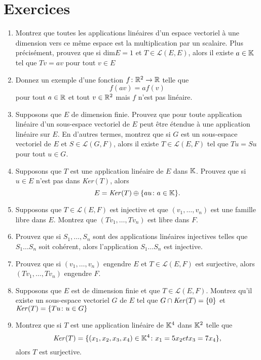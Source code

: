 \documentclass[12pt]{book}
\begin{document}
\section*{Exercices}
\begin{enumerate}
    \item Montrez que toutes les applications linéaires d'un espace vectoriel à une dimension vers ce même espace est la multiplication par un scalaire. Plus précisément, prouvez que si dim$E=1$ et $T\in\mathcal{L}(E,E)$, alors il existe $a\in\mathbb{K}$ tel que $Tv=av$ pour tout $v\in E$
    \item Donnez un exemple d'une fonction $f\colon\mathbb{R}^2\rightarrow\mathbb{R}$ telle que 
    \begin{equation*}
        f(av)=af(v)
    \end{equation*}
    pour tout $a\in\mathbb{R}$ et tout $v\in\mathbb{R}^2$ mais $f$ n'est pas linéaire.
    \item Supposons que $E$ de dimension finie. Prouvez que pour toute application linéaire d'un sous-espace vectoriel de $E$ peut être étendue à une application linéaire sur $E$. En d'autres termes, montrez que si $G$ est un sous-espace vectoriel de $E$ et $S\in\mathcal{L}(G,F)$, alors il existe $T\in\mathcal{L}(E,F)$ tel que $Tu=Su$ pour tout $u\in G$.
    \item Supposons que $T$ est une application linéaire de $E$ dans $\mathbb{K}$. Prouvez que si $u\in E$ n'est pas dans \textit{Ker}$(T)$, alors
    \begin{equation*}
       E=\textrm{\textit{Ker}}(T)\oplus\{au\colon a\in \mathbb{K}\}.
    \end{equation*}
    \item Supposons que $T\in\mathcal{L}(E,F)$ est injective et que $(v_1,\ldots,v_n)$ est une famille libre dans $E$. Montrez que $(Tv_1,\ldots,Tv_n)$ est libre dans $F$.
    \item Prouvez que si $S_1,\ldots,S_n$ sont des applications linéaires injectives telles que $S_1\ldots S_n$ soit cohérent, alors l'application $S_1\ldots S_n$ est injective.
    \item Prouvez que si $(v_1,\ldots,v_n)$ engendre $E$ et $T\in\mathcal{L}(E,F)$ est surjective, alors $(Tv_1,\ldots,Tv_n)$ engendre $F$.
    \item Supposons que $E$ est de dimension finie et que $T\in\mathcal{L}(E,F)$. Montrez qu'il existe un sous-espace vectoriel $G$ de $E$ tel que $G\cap\textrm{\textit{Ker}}(T)=\{0\}$ et $\textrm{\textit{Ker}}(T)=\{Tu\colon u\in G\}$
    \item Montrez que si $T$ est une application linéaire de $\mathbb{K}^4$ dans $\mathbb{K}^2$ telle que 
    \begin{equation*}
        \textrm{\textit{Ker}}(T)=\{(x_1,x_2,x_3,x_4)\in\mathbb{K}^4\colon x_1=5x_2 et x_3=7x_4\},
    \end{equation*}
    alors $T$ est surjective.
\end{enumerate}
\end{document}

